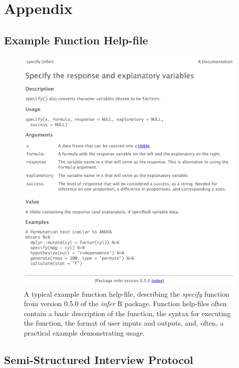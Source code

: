 \section{Appendix}\label{sec:appendix}

\subsection{Example Function Help-file}\label{fig:ex-help}

\begin{figure} [!htb]
    \centering
    \includegraphics[width=.9\linewidth]{figures/ex_help.png}
    \caption*{A typical example function help-file, describing the \textit{specify} function from version 0.5.0 of the \textit{infer} R package. Function help-files often contain a basic description of the function, the syntax for executing the function, the format of user inputs and outputs, and, often, a practical example demonstrating usage.}
\end{figure}

\clearpage

\subsection{Semi-Structured Interview Protocol}\label{sec:interview}

